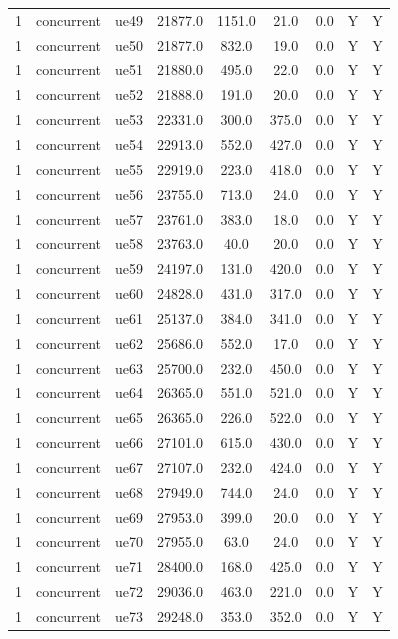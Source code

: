\begin{table}[ht]
\begin{tabular}{|c|c|c|c|c|c|c|c|c|}
1 & concurrent & ue49 & 21877.0 & 1151.0 & 21.0 & 0.0 & Y & Y \\
1 & concurrent & ue50 & 21877.0 & 832.0 & 19.0 & 0.0 & Y & Y \\
1 & concurrent & ue51 & 21880.0 & 495.0 & 22.0 & 0.0 & Y & Y \\
1 & concurrent & ue52 & 21888.0 & 191.0 & 20.0 & 0.0 & Y & Y \\
1 & concurrent & ue53 & 22331.0 & 300.0 & 375.0 & 0.0 & Y & Y \\
1 & concurrent & ue54 & 22913.0 & 552.0 & 427.0 & 0.0 & Y & Y \\
1 & concurrent & ue55 & 22919.0 & 223.0 & 418.0 & 0.0 & Y & Y \\
1 & concurrent & ue56 & 23755.0 & 713.0 & 24.0 & 0.0 & Y & Y \\
1 & concurrent & ue57 & 23761.0 & 383.0 & 18.0 & 0.0 & Y & Y \\
1 & concurrent & ue58 & 23763.0 & 40.0 & 20.0 & 0.0 & Y & Y \\
1 & concurrent & ue59 & 24197.0 & 131.0 & 420.0 & 0.0 & Y & Y \\
1 & concurrent & ue60 & 24828.0 & 431.0 & 317.0 & 0.0 & Y & Y \\
1 & concurrent & ue61 & 25137.0 & 384.0 & 341.0 & 0.0 & Y & Y \\
1 & concurrent & ue62 & 25686.0 & 552.0 & 17.0 & 0.0 & Y & Y \\
1 & concurrent & ue63 & 25700.0 & 232.0 & 450.0 & 0.0 & Y & Y \\
1 & concurrent & ue64 & 26365.0 & 551.0 & 521.0 & 0.0 & Y & Y \\
1 & concurrent & ue65 & 26365.0 & 226.0 & 522.0 & 0.0 & Y & Y \\
1 & concurrent & ue66 & 27101.0 & 615.0 & 430.0 & 0.0 & Y & Y \\
1 & concurrent & ue67 & 27107.0 & 232.0 & 424.0 & 0.0 & Y & Y \\
1 & concurrent & ue68 & 27949.0 & 744.0 & 24.0 & 0.0 & Y & Y \\
1 & concurrent & ue69 & 27953.0 & 399.0 & 20.0 & 0.0 & Y & Y \\
1 & concurrent & ue70 & 27955.0 & 63.0 & 24.0 & 0.0 & Y & Y \\
1 & concurrent & ue71 & 28400.0 & 168.0 & 425.0 & 0.0 & Y & Y \\
1 & concurrent & ue72 & 29036.0 & 463.0 & 221.0 & 0.0 & Y & Y \\
1 & concurrent & ue73 & 29248.0 & 353.0 & 352.0 & 0.0 & Y & Y \\

\end{tabular}
\end{table}
